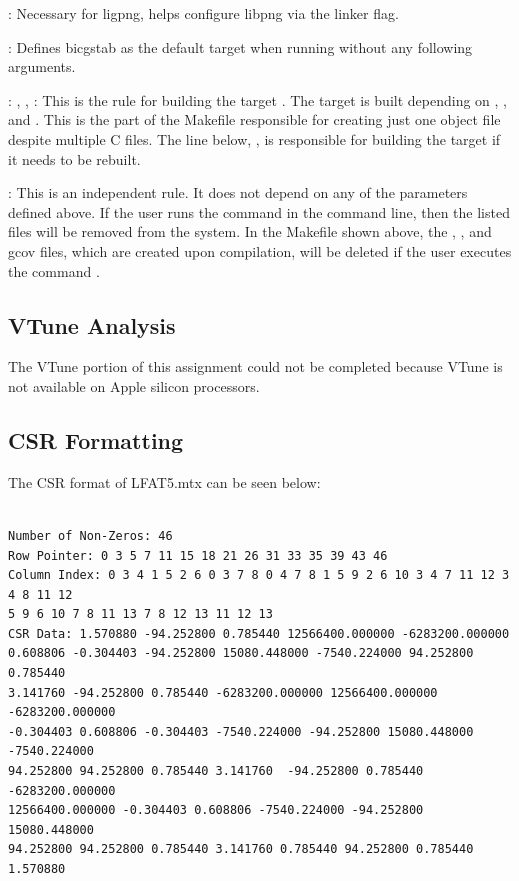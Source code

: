 \documentclass[12pt]{article}
\begin{document}
: Necessary for ligpng, helps configure libpng via the linker flag.

: Defines bicgstab as the default target when running  without any following arguments.

: , , : This is the rule for building the target . The target is built depending on , , and . This is the part of the Makefile responsible for creating just one object file despite multiple C files. The line below, , is responsible for building the target if it needs to be rebuilt.

: This is an independent rule. It does not depend on any of the parameters defined above. If the user runs the command  in the command line, then the listed files will be removed from the system. In the Makefile shown above, the , , and gcov files, which are created upon compilation, will be deleted if the user executes the command .

\subsection{VTune Analysis}

The VTune portion of this assignment could not be completed because VTune is not available on Apple silicon processors.

\subsection{CSR Formatting}

The CSR format of LFAT5.mtx can be seen below:

 	\begin{mdframed}[style=myboxstyleTerminal1]
		\begin{verbatim}

Number of Non-Zeros: 46
Row Pointer: 0 3 5 7 11 15 18 21 26 31 33 35 39 43 46 
Column Index: 0 3 4 1 5 2 6 0 3 7 8 0 4 7 8 1 5 9 2 6 10 3 4 7 11 12 3 4 8 11 12
5 9 6 10 7 8 11 13 7 8 12 13 11 12 13 
CSR Data: 1.570880 -94.252800 0.785440 12566400.000000 -6283200.000000 
0.608806 -0.304403 -94.252800 15080.448000 -7540.224000 94.252800 0.785440
3.141760 -94.252800 0.785440 -6283200.000000 12566400.000000 -6283200.000000 
-0.304403 0.608806 -0.304403 -7540.224000 -94.252800 15080.448000 -7540.224000
94.252800 94.252800 0.785440 3.141760  -94.252800 0.785440 -6283200.000000
12566400.000000 -0.304403 0.608806 -7540.224000 -94.252800 15080.448000 
94.252800 94.252800 0.785440 3.141760 0.785440 94.252800 0.785440 1.570880

		\end{verbatim}
	\end{mdframed}
\end{document}
